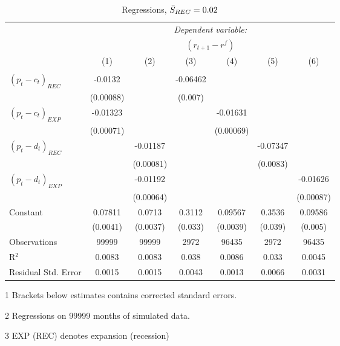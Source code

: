 \begin{table}[H]
\centering   
  \caption{Regressions, $\Bar{S}_{REC} = 0.02$}           
  \label{tabregress2}     
  \begin{threeparttable}
\begin{tabular}{@{\hspace{5pt}}l@{\hspace{5pt}}cccccc} 
\toprule 
 & \multicolumn{6}{c}{\textit{Dependent variable:}} \\ 
 & \multicolumn{6}{c}{$\left(r_{t+1}-r^f\right)$} \\ 
 \cmidrule(rr){2-7}
 & (1) & (2) & (3) & (4) & (5) & (6) \\ 
\midrule  
\\[-2.1ex] $\left( p_t - c_t \right)_{REC}$ &-0.0132& &-0.06462 & & &\\ 
  & (0.00088) & &(0.007) & & & \\ 
 \addlinespace 
  $\left( p_t - c_t \right)_{EXP}$ &-0.01323  &    & &-0.01631 & &  \\ 
  & (0.00071) & & &(0.00069) & & \\ 
 \addlinespace 
  $\left( p_t - d_t \right)_{REC}$ & &-0.01187& & & -0.07347  &   \\ 
                                   & &  (0.00081) & & & (0.0083) &    \\ 
 \addlinespace 
  $\left( p_t - d_t \right)_{EXP}$ & &   -0.01192& & & &-0.01626 \\ 
                                   & &  (0.00064) & & & &(0.00087) \\ 
 \addlinespace 
 Constant &0.07811 &0.0713&0.3112 &0.09567 &0.3536 &0.09586 \\ 
          &(0.0041) &(0.0037)&(0.033)&(0.0039)&(0.039)&(0.005) \\ 
 \addlinespace 
\midrule  
Observations & 99999 & 99999&2972 & 96435&2972&96435\\
R$^{2}$ &0.0083 & 0.0083&0.038&0.0086&0.033&0.0045 \\ 
Residual Std. Error &0.0015 & 0.0015&0.0043&0.0013&0.0066&0.0031 \\ 
\bottomrule 
\end{tabular} 
\begin{tablenotes}
\footnotesize{
\item[1] Brackets below estimates contains \citet{NW87} corrected standard errors. 
\item[2] Regressions on 99999 months of simulated data.
\item[3] EXP (REC) denotes expansion (recession)
}
\end{tablenotes}
\end{threeparttable}
\end{table} 
